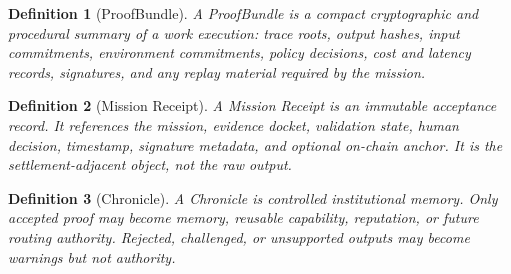 \documentclass[11pt]{article}
\newtheorem{definition}{Definition}[section]
\begin{document}
\begin{definition}[ProofBundle]
A \emph{ProofBundle} is a compact cryptographic and procedural summary of a work execution: trace roots, output hashes, input commitments, environment commitments, policy decisions, cost and latency records, signatures, and any replay material required by the mission.
\end{definition}

\begin{definition}[Mission Receipt]
A \emph{Mission Receipt} is an immutable acceptance record. It references the mission, evidence docket, validation state, human decision, timestamp, signature metadata, and optional on-chain anchor. It is the settlement-adjacent object, not the raw output.
\end{definition}

\begin{definition}[Chronicle]
A \emph{Chronicle} is controlled institutional memory. Only accepted proof may become memory, reusable capability, reputation, or future routing authority. Rejected, challenged, or unsupported outputs may become warnings but not authority.
\end{definition}
\end{document}
